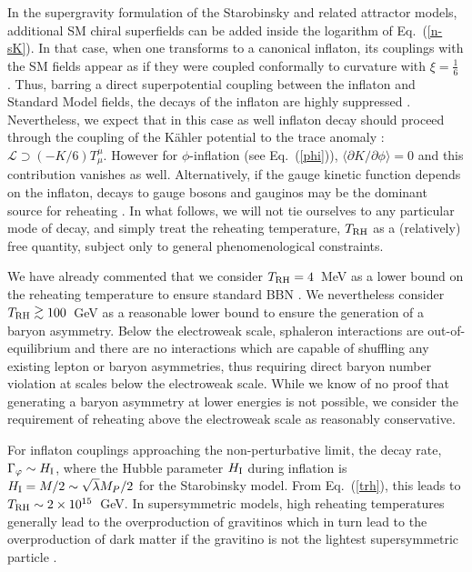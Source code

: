 \documentclass[aps,prev,twocolumn,preprintnumbers,floatfix,nofootinbib]{revtex4-1}
\newcommand{\ga}{\lower.7ex\hbox{$\;\stackrel{\textstyle>}{\sim}\;$}}
\newcommand{\trh}{T_{\rm RH}}
\begin{document}
In the supergravity formulation of the Starobinsky and related attractor models, additional SM chiral superfields can be added inside the logarithm of Eq.~(\ref{n-sK}). 
In that case, when one transforms to a canonical inflaton, its couplings with the SM fields appear as if they were coupled conformally to curvature with $\xi = \frac16$ \cite{eno9,Ema:2024sit}. Thus, barring a direct superpotential coupling between the inflaton and Standard Model fields, the decays of the inflaton are highly suppressed \cite{Endo:2006xg,egno4}. Nevertheless, we expect that in this case as well inflaton decay should proceed through 
the coupling of the K\"ahler potential to the trace anomaly \cite{Endo:2007sz}: $\mathcal{L} \supset (-K/6)T^\mu_\mu$. However for $\phi$-inflation (see Eq.~(\ref{phi})), $\langle \partial K/\partial\phi \rangle = 0$ and this contribution vanishes as well. Alternatively,
if the gauge kinetic function depends on the inflaton, decays to gauge bosons and gauginos may be the dominant source for reheating \cite{Endo:2006xg,egno4}. In what follows, we will not tie ourselves to any particular mode of decay, and simply treat the reheating temperature, $T_{\rm RH}$ as a (relatively) free quantity, subject only to general phenomenological constraints. 

We have already commented that we consider 
$\trh = 4$~MeV as a lower bound on the reheating temperature to ensure standard BBN \cite{tr4}. 
We nevertheless consider $\trh \ga 100$~GeV
as a reasonable lower bound to ensure the generation of a baryon asymmetry. Below the electroweak scale, sphaleron interactions are out-of-equilibrium and there are no interactions which are capable of shuffling any existing lepton or baryon asymmetries, thus requiring direct baryon number violation at scales below the electroweak scale. While we know of no proof that generating
a baryon asymmetry at lower energies is not possible, we consider the requirement of reheating above the electroweak scale as reasonably conservative. 


For inflaton couplings approaching the non-perturbative limit, the decay rate, $\Gamma_\varphi
\sim H_{\rm I}$, where the Hubble parameter $H_{\rm I}$ during inflation is $H_{\rm I} = M/2 \sim \sqrt{\lambda} M_P/2$ for the Starobinsky model. From Eq.~(\ref{trh}),
this leads to $\trh \sim 2 \times 10^{15}$~GeV.
In supersymmetric models, high reheating temperatures generally lead to the overproduction of gravitinos which in turn lead to the overproduction of dark matter if the gravitino is not the lightest supersymmetric particle \cite{Moroi:1994rs,ego,Ellis:2015jpg}. 
\end{document}
